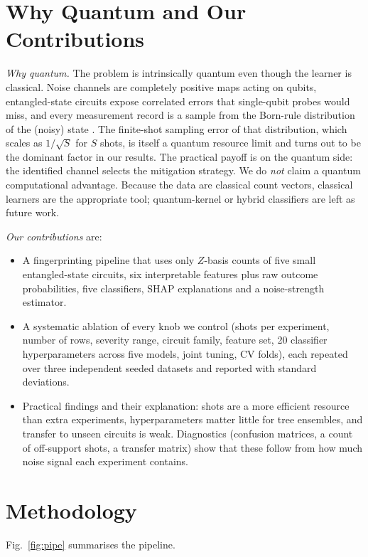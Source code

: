 \documentclass[conference]{IEEEtran}
\begin{document}
\section{Why Quantum and Our Contributions}\label{sec:why}
\emph{Why quantum.} The problem is intrinsically quantum even though the learner is classical. Noise channels are completely positive maps acting on qubits, entangled-state circuits expose correlated errors that single-qubit probes would miss, and every measurement record is a sample from the Born-rule distribution of the (noisy) state \cite{nielsen}. The finite-shot sampling error of that distribution, which scales as $1/\sqrt{S}$ for $S$ shots, is itself a quantum resource limit and turns out to be the dominant factor in our results. The practical payoff is on the quantum side: the identified channel selects the mitigation strategy. We do \emph{not} claim a quantum computational advantage. Because the data are classical count vectors, classical learners are the appropriate tool; quantum-kernel or hybrid classifiers are left as future work.

\emph{Our contributions} are:
\begin{itemize}
\item A fingerprinting pipeline that uses only $Z$-basis counts of five small entangled-state circuits, six interpretable features plus raw outcome probabilities, five classifiers, SHAP explanations and a noise-strength estimator.
\item A systematic ablation of every knob we control (shots per experiment, number of rows, severity range, circuit family, feature set, 20 classifier hyperparameters across five models, joint tuning, CV folds), each repeated over three independent seeded datasets and reported with standard deviations.
\item Practical findings and their explanation: shots are a more efficient resource than extra experiments, hyperparameters matter little for tree ensembles, and transfer to unseen circuits is weak. Diagnostics (confusion matrices, a count of off-support shots, a transfer matrix) show that these follow from how much noise signal each experiment contains.
\end{itemize}

\section{Methodology}\label{sec:method}
Fig.~\ref{fig:pipe} summarises the pipeline.
\end{document}
